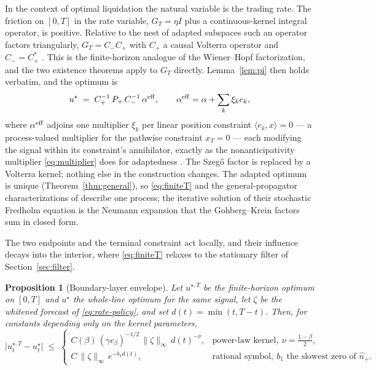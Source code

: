 \documentclass[11pt]{article}
\theoremstyle{plain}
\newtheorem{proposition}{Proposition}
\theoremstyle{definition}
\theoremstyle{remark}
\begin{document}
In the context of optimal liquidation the natural variable is the trading rate. The friction on $[0,T]$ in the rate variable, $G_T=\eta I$ plus a continuous-kernel integral operator, is positive. Relative to the nest of adapted subspaces such an operator factors triangularly, $G_T=C_-C_+$ with $C_+$ a causal Volterra operator and $C_-=C_+^\ast$ \citep{GohbergKrein1970,Arveson1975}. This is the finite-horizon analogue of the Wiener--Hopf factorization, and the two existence theorems apply to $G_T$ directly. Lemma~\ref{lem:pi} then holds verbatim, and the optimum is
\begin{equation}\label{eq:finiteT}
u^\star \;=\; C_+^{-1}\,P_+\,C_-^{-1}\,\alpha^{\rm eff},
\qquad \alpha^{\rm eff}=\alpha+\sum_k\xi_k e_k,
\end{equation}
where $\alpha^{\rm eff}$ adjoins one multiplier $\xi_k$ per linear position constraint $\langle e_k,x\rangle=0$ --- a process-valued multiplier for the pathwise constraint $x_T=0$ --- each modifying the signal within its constraint's annihilator, exactly as the nonanticipativity multiplier \eqref{eq:multiplier} does for adaptedness \citep{AbiJaberDeCarvalhoPham2024}. The Szeg\H{o} factor is replaced by a Volterra kernel; nothing else in the construction changes. The adapted optimum is unique (Theorem~\ref{thm:general}), so \eqref{eq:finiteT} and the general-propagator characterizations of \citet{AbiJaberNeuman2025,AbiJaberNeumanTuschmann2024,AbiJaberDeCarvalhoPham2024} describe one process; the iterative solution of their stochastic Fredholm equation is the Neumann expansion that the Gohberg--Krein factors sum in closed form.

The two endpoints and the terminal constraint act locally, and their influence decays into the interior, where \eqref{eq:finiteT} relaxes to the stationary filter of Section~\ref{sec:filter}.

\begin{proposition}[Boundary-layer envelope]\label{prop:boundary}
Let $u^{\star,T}$ be the finite-horizon optimum on $[0,T]$ and $u^\star$ the whole-line optimum for the same signal, let $\zeta$ be the whitened forecast of \eqref{eq:rate-policy}, and set $d(t)=\min(t,T-t)$. Then, for constants depending only on the kernel parameters,
\begin{equation}\label{eq:bdry-decay}
\bigl|u^{\star,T}_t-u^\star_t\bigr| \;\le\;
\begin{cases}
C(\beta)\,(\gamma c_\beta)^{-1/2}\,\|\zeta\|_\infty\,d(t)^{-\nu}, & \text{power-law kernel},\ \nu=\tfrac{1-\beta}{2},\\[3pt]
C\,\|\zeta\|_\infty\,e^{-b_1 d(t)}, & \text{rational symbol},\ b_1 \text{ the slowest zero of }\hat n_+ .
\end{cases}
\end{equation}
\end{proposition}
\end{document}
